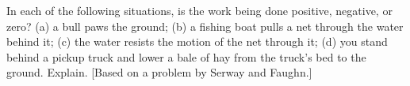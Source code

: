In each of the following situations, is the work being
done positive, negative, or zero? (a) a bull paws the
ground; (b) a fishing boat pulls a net through the water
behind it; (c) the water resists the motion of the net
through it; (d) you stand behind a pickup truck and lower a
bale of hay from the truck's bed to the ground. Explain.
[Based on a problem by Serway and Faughn.]
